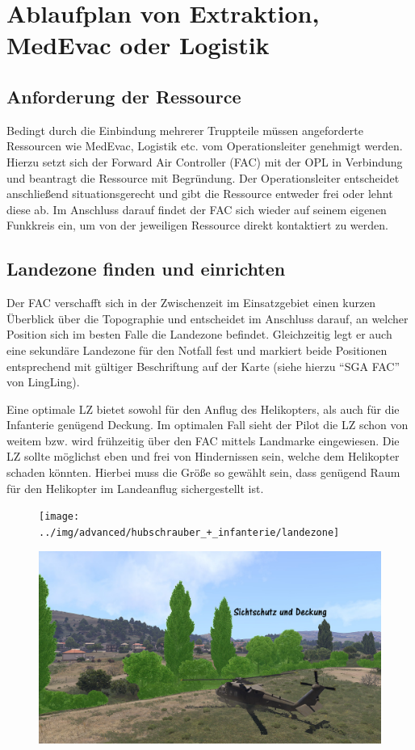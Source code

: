 \section{Ablaufplan von Extraktion, MedEvac oder Logistik}
\subsection{Anforderung der Ressource}
	Bedingt durch die Einbindung mehrerer Truppteile müssen angeforderte Ressourcen wie MedEvac, Logistik etc. vom Operationsleiter genehmigt werden. Hierzu setzt sich der Forward Air Controller (FAC) mit der OPL in Verbindung und beantragt die Ressource mit Begründung. Der Operationsleiter entscheidet anschließend situationsgerecht und gibt die Ressource entweder frei oder lehnt diese ab. Im Anschluss darauf findet der FAC sich wieder auf seinem eigenen Funkkreis ein, um von der jeweiligen Ressource direkt kontaktiert zu werden. 

\subsection{Landezone finden und einrichten}
	Der FAC verschafft sich in der Zwischenzeit im Einsatzgebiet einen kurzen Überblick über die Topographie und entscheidet im Anschluss darauf, an welcher Position sich im besten Falle die Landezone befindet. Gleichzeitig legt er auch eine sekundäre Landezone für den Notfall fest und markiert beide Positionen entsprechend mit gültiger Beschriftung auf der Karte (siehe hierzu “SGA FAC” von LingLing).\par
	Eine optimale LZ bietet sowohl für den Anflug des Helikopters, als auch für die Infanterie genügend Deckung. Im optimalen Fall sieht der Pilot die LZ schon von weitem bzw. wird frühzeitig über den FAC mittels Landmarke eingewiesen. Die LZ sollte möglichst eben und frei von Hindernissen sein, welche dem Helikopter schaden könnten. Hierbei muss die Größe so gewählt sein, dass genügend Raum für den Helikopter im Landeanflug sichergestellt ist. 
	\begin{figure}[htbp]
		\centering
		\texttt{[image: ../img/advanced/hubschrauber\_+\_infanterie/landezone]}
	\end{figure}
	\begin{figure}[htbp]
		\centering
		\includegraphics[width=0.95\linewidth]{../img/advanced/hubschrauber_+_infanterie/verdeckte-landung}
	\end{figure}	

